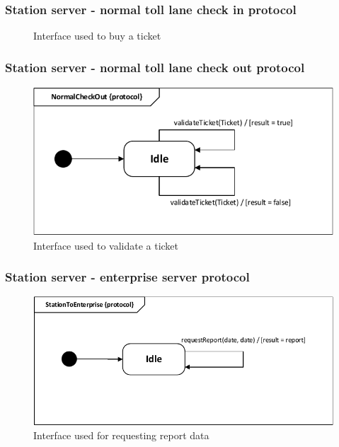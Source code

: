 \subsubsection*{Station server - normal toll lane check in protocol}
\begin{figure}[H]
\centering
\caption{Interface used to buy a ticket}
\label{fig:protocol_state_machine_station_server_to_normal_lane_check_in}
\end{figure}

\subsubsection*{Station server - normal toll lane check out protocol}
\begin{figure}[H]
\centering
\includegraphics[width=0.7\linewidth]{img/behaviour_state_machines/protocol_state_machines/protocol_state_machine_station_server_to_normal_lane_check_out}
\caption{Interface used to validate a ticket}
\label{fig:protocol_state_machine_station_server_to_normal_lane_check_out}
\end{figure}

\subsubsection*{Station server - enterprise server protocol}
\begin{figure}[H]
\centering
\includegraphics[width=0.7\linewidth]{img/behaviour_state_machines/protocol_state_machines/protocol_state_machine_station_server_to_enterprise_server}
\caption{Interface used for requesting report data}
\label{fig:protocol_state_machine_station_server_to_enterprise_server}
\end{figure}

